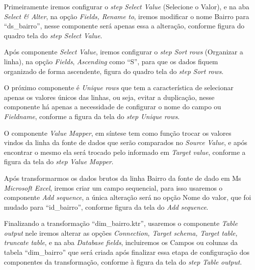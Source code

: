 Primeiramente iremos configurar o \textit{step Select Value} (Selecione o Valor), e na aba \textit{Select & Alter}, na op\c{c}\~{a}o \textit{Fields, Rename to}, iremos modificar o nome Bairro para ``ds\_bairro'', nesse componente ser\'{a} apenas essa a altera\c{c}\~{a}o, conforme figura do quadro tela do \textit{step Select Value}.

Ap\'os  componente \textit{Select Value}, iremos configurar o \textit{step Sort rows} (Organizar a linha), na op\c{c}\~{a}o \textit{Fields}, \textit{Ascending} como ``S'', para que os dados fiquem organizado de forma ascendente, figura do quadro tela do \textit{step Sort rows}.

O pr\'oximo componente \'{e} \textit{Unique rows} que tem a caracter\'{i}stica de selecionar apenas os valores únicos das linhas, ou seja, evitar a duplica\c{c}\~{a}o, nesse componente h\'{a} apenas a necessidade de configurar o nome do campo ou \textit{Fieldname}, conforme a figura da tela do \textit{step Unique rows}.

O componente \textit{Value Mapper}, em s\'{i}ntese tem como fun\c{c}\~{a}o trocar os valores vindos da linha da fonte de dados que ser\~{a}o comparados no \textit{Source Value}, e ap\'os encontrar o mesmo ela ser\'{a} trocado pelo informado em \textit{Target value}, conforme a figura da tela do \textit{step Value Mapper}.

Ap\'os transformarmos os dados brutos da linha Bairro da fonte de dado em Ms \textit{Microsoft Excel}, iremos criar um campo sequencial, para isso usaremos o componente \textit{Add sequence}, a única altera\c{c}\~{a}o ser\'{a} no op\c{c}\~{a}o Nome do valor, que foi mudado para ``id\_bairro'', conforme figura da tela do \textit{Add sequence}.

Finalizando a transforma\c{c}\~{a}o ``dim\_bairro.ktr'', usaremos o componente \textit{Table output} nele iremos alterar as op\c{c}\~{o}es \textit{Connection, Target schema, Target table, truncate table}, e na aba \textit{Database fields}, incluiremos os Campos ou colunas da tabela ``dim\_bairro'' que ser\'{a} criada ap\'os finalizar essa etapa de configura\c{c}\~{a}o dos componentes da transforma\c{c}\~{a}o, conforme \`{a} figura da tela do \textit{step Table output}.

